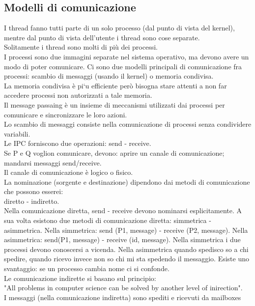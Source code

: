 \documentclass{article}
\begin{document}
\subsection*{Modelli di comunicazione}
I thread fanno tutti parte di un solo processo (dal punto di vista del kernel),
mentre dal punto di vista dell'utente i thread sono cose separate.\\
Solitamente i thread sono molti di pi\`{u} dei processi.\\
I processi sono due immagini separate nel sistema operativo, ma devono avere
un modo di poter comunicare. Ci sono due modelli principali di comunicazione fra processi:
scambio di messaggi (usando il kernel) o memoria condivisa.\\
La memoria condivisa \`{e} pi`{u} efficiente per\`{o} bisogna
stare attenti a non far accedere processi non autorizzati a tale memoria.\\
Il message passaing \`{e} un insieme di meccanismi utilizzati dai processi 
per comunicare e sincronizzare le loro azioni.\\
Lo scambio di messaggi consiste nella comunicazione di processi senza condividere 
variabili.\\
Le IPC forniscono due operazioni: send - receive.\\
Se P e Q voglion comunicare, devono: aprire un canale di comunicazione; mandarsi messaggi send/receive.\\
Il canale di comunicazione \`{e} logico o fisico.\\
La nominazione (sorgente e destinazione) dipendono dai metodi di comunicazione che possono esserei:\\
diretto - indiretto.\\
Nella comunicazione diretta, send - receive devono nominarsi esplicitamente. 
A sua volta esistono due metodi di comunicazione diretta: simmetrica - asimmetrica.
Nella simmetrica: send (P1, message) - receive (P2, message). Nella asimmetrica: send(P1, message) - receive (id, message).
Nella simmetrica i due processi devono conoscersi a vicenda. Nella asimmetrica quando spedisco so a chi spedire, quando ricevo invece non so chi mi sta spedendo
il messaggio. Esiste uno svantaggio: se un processo cambia nome ci si confonde.\\
Le comunicazione indirette si basano sul principio:\\
"All problems in computer science can be solved by another level of inirection".\\
I messaggi (nella comunicazione indiretta) sono spediti e ricevuti da mailboxes 
\end{document}
